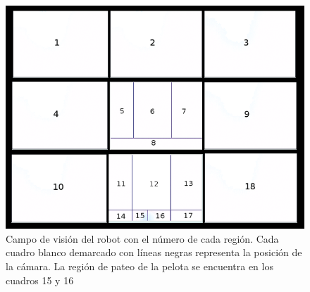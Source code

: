 


\begin{figure}[hbtp]
\label{divisionCam}
\centering
\includegraphics[scale=0.3]{imagenes/unnamed.png}
\caption{Campo de visión del robot con el número de cada región. Cada cuadro blanco demarcado con líneas negras representa la posición de la cámara. La región de pateo de la pelota se encuentra en los cuadros 15 y 16 }
\end{figure}
